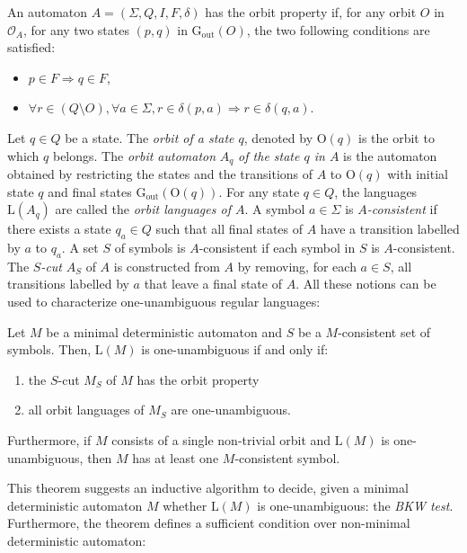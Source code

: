 \documentclass{llncs}
\begin{document}
\begin{definition}
	An automaton $A=(\Sigma,Q,I,F,\delta)$ has the orbit property if, for any orbit $O$ in $\mathcal{O}_A$, for any two states $(p,q)$ in $\mathrm{G_{out}}(O)$, the two following conditions are satisfied:
	\begin{itemize}
		\item $p \in F \Longrightarrow q \in F$,
		\item $\forall r \in (Q \setminus O), \forall a \in \Sigma, r \in \delta(p,a) \Longrightarrow r \in \delta(q,a)$.
	\end{itemize}
\end{definition}
	Let $q \in Q$ be a state. 
	The \emph{orbit of a state $q$}, denoted by $\mathrm{O}(q)$ is the orbit to which $q$ belongs.
	The \emph{orbit automaton} $A_q$ \emph{of the state $q$ in $A$} is the automaton obtained by restricting the states and the transitions of $A$ to $\mathrm{O}(q)$ with initial state $q$ and final states $\mathrm{G_{out}}(\mathrm{O}(q))$. For any state $q \in Q$, the languages $\mathrm{L}(A_q)$ are called the \emph{orbit languages of $A$}.
	A symbol $a \in \Sigma$ is \emph{$A$-consistent} if there exists a state $q_a \in Q$ such that all final states of $A$ have a transition labelled by $a$ to $q_a$. 
	A set $S$ of symbols is $A$-consistent if each symbol in $S$ is $A$-consistent.
The \emph{$S$-cut} $A_S$ of $A$ is constructed from $A$ by removing, for each $a \in S$, all transitions labelled by $a$ that leave a final state of $A$.
	All these notions can be used to characterize one-unambiguous regular languages:



\begin{theorem}[\cite{BW98}]\label{th:1NA}
	Let $M$ be a minimal deterministic automaton and $S$ be a $M$-consistent set of symbols. 
	Then, $\mathrm{L}(M)$ is one-unambiguous if and only if:
	\begin{enumerate}
		\item the $S$-cut $M_S$ of $M$ has the orbit property
		\item all orbit languages of $M_S$ are one-unambiguous.
	\end{enumerate}
	Furthermore, if $M$ consists of a single non-trivial orbit and $\mathrm{L}(M)$ is one-unambi\-guous, then $M$ has at least one $M$-consistent symbol.
\end{theorem}
	This theorem suggests an inductive algorithm to decide, given a minimal deterministic automaton $M$ whether $\mathrm{L}(M)$ is one-unambiguous: 
	the \emph{BKW test}.
Furthermore, the theorem defines a sufficient condition over non-minimal deterministic automaton:
\end{document}
